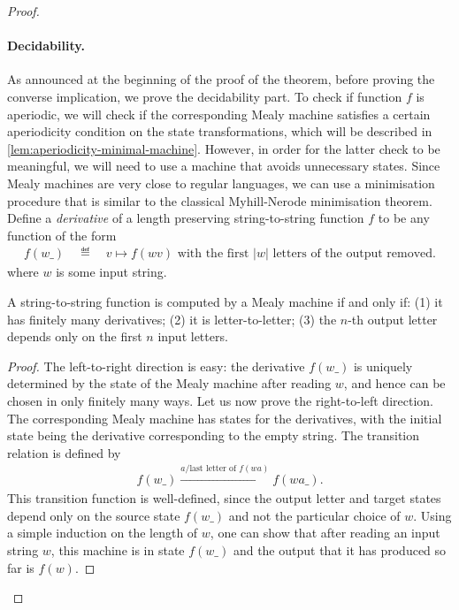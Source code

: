 \begin{proof}
    \paragraph*{Decidability.} As announced at the beginning of the proof of the theorem, before proving the converse implication, we  prove the decidability part. To check if function $f$ is aperiodic, we will check if the corresponding Mealy machine satisfies a certain aperiodicity condition on the state transformations, which will be described in \cref{lem:aperiodicity-minimal-machine}.  However, in order for the latter check to be meaningful, we will need to use a machine that avoids unnecessary states.  
    Since Mealy machines are very close to regular languages, we can use a minimisation procedure that is similar to the classical Myhill-Nerode minimisation theorem. 
    Define a \emph{derivative} of  a length preserving string-to-string function $f$ to be  any function of the form 
    \begin{align*}
    f(w\_)  \quad \eqdef \quad  v \mapsto f(wv) \text{ with the first $|w|$ letters of the output removed.}
    \end{align*}
    where $w$ is some input string. 
    
    \begin{lemma}\label{lemma:derivatives}
        A string-to-string function is computed by a Mealy machine if and only if: (1) it has finitely many derivatives; (2)  it is letter-to-letter; (3) the $n$-th output letter depends only on the first $n$ input letters.
    \end{lemma}
    \begin{proof}
        The left-to-right direction is easy: the derivative $f(w\_)$ is uniquely determined by the state of the Mealy machine after reading $w$, and hence can be chosen in only finitely many ways. Let us now prove the right-to-left direction. The corresponding Mealy machine has states for the derivatives, with the initial state being the derivative corresponding to the empty string. The transition relation is defined by
        \begin{align*}
        f(w\_) \xrightarrow {a / \text{last letter of $f(wa)$}} f(wa\_).
        \end{align*}
        This transition function is well-defined, since the output letter and target states depend only on the source state $f(w\_)$ and not the particular choice of $w$. Using a simple induction on the length of $w$, one can show that after reading an input string $w$, this machine is in state $f(w\_)$ and the output that it has produced so far is $f(w)$.
    \end{proof}


\end{proof}

